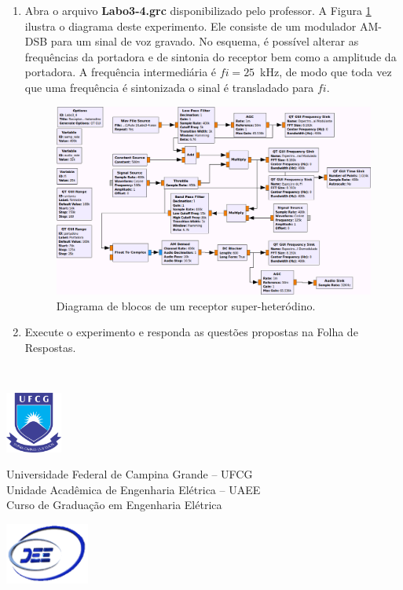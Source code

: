 \documentclass[12pt,addpoints]{exam}
\newcommand{\myscale}{0.4}
\begin{document}
\begin{enumerate}
    \item  Abra o arquivo \textbf{Labo3-4.grc} disponibilizado pelo professor. A Figura \ref{fig:GRC_3-1d} ilustra o diagrama deste experimento. Ele consiste de um modulador AM-DSB para um sinal de voz gravado. No esquema, é possível alterar as frequências da portadora e de sintonia do receptor bem como a amplitude da portadora. A frequência intermediária é $fi = 25$~kHz, de modo que toda vez que uma frequência é sintonizada o sinal é transladado para $fi$. 
    \begin{figure}[htb]
        \centering
        \includegraphics[scale=\myscale]{./Figuras/Labo3-4}
        \caption{Diagrama de blocos de um receptor super-heteródino.} 
        \label{fig:GRC_3-1d}
    \end{figure}
  \item Execute o experimento e responda as questões propostas na Folha de Respostas.
\end{enumerate}

\newpage \ \newpage {}

\noindent \includegraphics[height=2cm]{../Figuras/UFCGLogo} \hfill
\begin{minipage}{.66\textwidth} \large \centering \vspace{-1.8cm}
    Universidade Federal de Campina Grande -- UFCG \\
    Unidade Acadêmica de Engenharia Elétrica -- UAEE \\
    Curso de Graduação em Engenharia Elétrica
\end{minipage}
\hfill \includegraphics[height=2cm]{../Figuras/DEELogo} \\[12pt]
\end{document}
